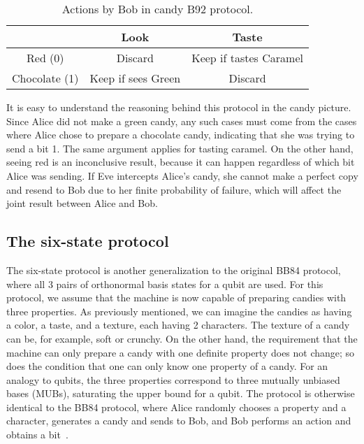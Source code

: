 \documentclass{article}
\begin{document}
\begin{table}[h!]
	\centering
	\begin{tabular}{ |c|c|c| } 
		\hline
		\backslashbox{Alice}{Bob} & Look & Taste \\ 
		\hline 
		Red (0) & Discard & Keep if tastes Caramel \\
		\hline 
		Chocolate (1) & Keep if sees Green & Discard \\ 
		\hline
	\end{tabular}
	\caption{Actions by Bob in candy B92 protocol.}
	\label{table3}
\end{table}

It is easy to understand the reasoning behind this protocol in the candy picture.
Since Alice did not make a green candy, any such cases must come from the cases where Alice chose to prepare a chocolate candy, indicating that she was trying to send a bit 1.
The same argument applies for tasting caramel.
On the other hand, seeing red is an inconclusive result, because it can happen regardless of which bit Alice was sending.
If Eve intercepts Alice's candy, she cannot make a perfect copy and resend to Bob due to her finite probability of failure, which will affect the joint result between Alice and Bob.

\subsection{The six-state protocol}
The six-state protocol is another generalization to the original BB84 protocol, where all 3 pairs of orthonormal basis states for a qubit are used.
For this protocol, we assume that the machine is now capable of preparing candies with three properties.
As previously mentioned, we can imagine the candies as having a color, a taste, and a texture, each having 2 characters.
The texture of a candy can be, for example, soft or crunchy.
On the other hand, the requirement that the machine can only prepare a candy with one definite property does not change; so does the condition that one can only know one property of a candy.
For an analogy to qubits, the three properties correspond to three mutually unbiased bases (MUBs), saturating the upper bound for a qubit.
The protocol is otherwise identical to the BB84 protocol, where Alice randomly chooses a property and a character, generates a candy and sends to Bob, and Bob performs an action and obtains a bit~\cite{kato2016security}.
\end{document}
